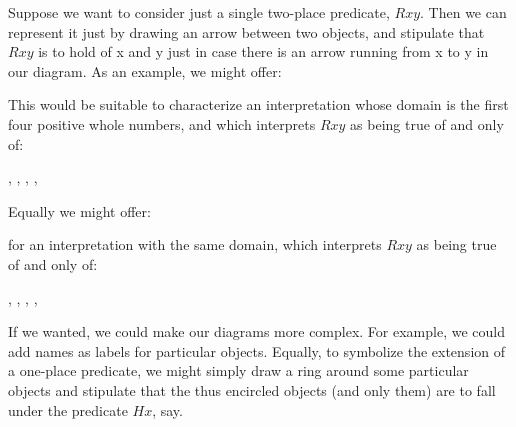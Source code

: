 
Suppose we want to consider just a single two-place predicate, $Rxy$. Then we can represent it just by drawing an arrow between two objects, and stipulate that $Rxy$ is to hold of x and y just in case there is an arrow running from x to y in our diagram. As an example, we might offer:
\begin{center}
\end{center}
This would be suitable to characterize an interpretation whose domain is the first four positive whole numbers, and which interprets $Rxy$ as being true of and only of:
	\begin{center}
		, 
		, 
		, 
		, 
	\end{center}
Equally we might offer:

\begin{center}
\end{center}
for an interpretation with the same domain, which interprets $Rxy$ as being true of and only of:
	\begin{center}
		, 
		, 
		, 
		,
	\end{center}
If we wanted, we could make our diagrams more complex. For example, we could add names as labels for particular objects. Equally, to symbolize the extension of a one-place predicate, we might simply draw a ring around some particular objects and stipulate that the thus encircled objects (and only them) are to fall under the predicate $Hx$, say. 


